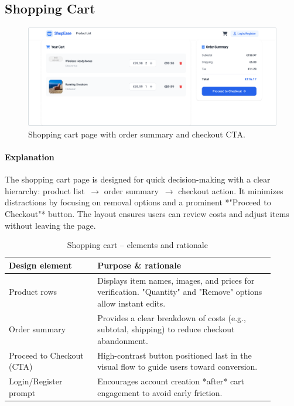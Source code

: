 \documentclass[11pt,a4paper]{article}
\begin{document}

	\subsection{Shopping Cart}\label{subsec:shopping-cart}

	\begin{figure}[H]
		\centering
		\includegraphics[width=\linewidth]{pictures/main/CartPage_Figma}%
		\caption{Shopping cart page with order summary and checkout CTA.}
		\label{fig:ui-cart}
	\end{figure}

	\paragraph{Explanation}%
	The shopping cart page is designed for quick decision-making with a clear hierarchy:
	product list~$\rightarrow$ order summary~$\rightarrow$ checkout action. It minimizes distractions
	by focusing on removal options and a prominent *"Proceed to Checkout"* button.
	The layout ensures users can review costs and adjust items without leaving the page.

	\begin{table}[H]
		\centering
		\caption{Shopping cart – elements and rationale}
		\label{tab:cart-elements}

		\begin{tabular}{p{0.30\linewidth} p{0.60\linewidth}}
        	\toprule
        	\textbf{Design element} & \textbf{Purpose \& rationale} \\ \midrule
				Product rows            & Displays item names, images, and prices for verification. "Quantity" and "Remove" options allow instant edits. \\
        		Order summary           & Provides a clear breakdown of costs (e.g., subtotal, shipping) to reduce checkout abandonment. \\
        		Proceed to Checkout (CTA) & High-contrast button positioned last in the visual flow to guide users toward conversion. \\
        		Login/Register prompt   & Encourages account creation *after* cart engagement to avoid early friction. \\
        	\bottomrule
    	\end{tabular}

	\end{table}
\end{document}

